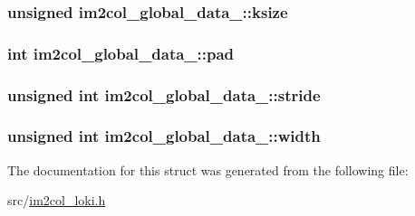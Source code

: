 \subsubsection[{ksize}]{\setlength{\rightskip}{0pt plus 5cm}unsigned im2col\+\_\+global\+\_\+data\+\_\+\+::ksize}\hypertarget{structim2col__global__data___a47c5f04fbc305bd5d649aef39994ba7d}{}\label{structim2col__global__data___a47c5f04fbc305bd5d649aef39994ba7d}
\subsubsection[{pad}]{\setlength{\rightskip}{0pt plus 5cm}int im2col\+\_\+global\+\_\+data\+\_\+\+::pad}\hypertarget{structim2col__global__data___af3642914d12836e0b686b7ee1f18e7a6}{}\label{structim2col__global__data___af3642914d12836e0b686b7ee1f18e7a6}
\subsubsection[{stride}]{\setlength{\rightskip}{0pt plus 5cm}unsigned int im2col\+\_\+global\+\_\+data\+\_\+\+::stride}\hypertarget{structim2col__global__data___a8832dbb23824552fbfcfaeac820c5b1a}{}\label{structim2col__global__data___a8832dbb23824552fbfcfaeac820c5b1a}
\subsubsection[{width}]{\setlength{\rightskip}{0pt plus 5cm}unsigned int im2col\+\_\+global\+\_\+data\+\_\+\+::width}\hypertarget{structim2col__global__data___af5d96d75182fe5e814ef1de4545a856f}{}\label{structim2col__global__data___af5d96d75182fe5e814ef1de4545a856f}


The documentation for this struct was generated from the following file\+:\begin{DoxyCompactItemize}
\item 
src/\hyperlink{im2col__loki_8h}{im2col\+\_\+loki.\+h}\end{DoxyCompactItemize}
